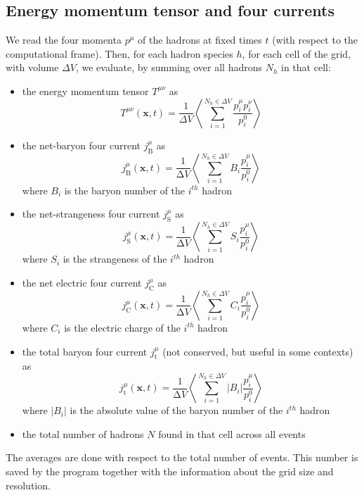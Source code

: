\documentclass[12pt, a4paper]{article}
\def\x{{\boldsymbol x}}
\begin{document}
\subsection{Energy momentum tensor and four currents}
We read the four momenta $p^\mu$ of the hadrons at fixed times $t$ (with respect to the computational frame). Then, for each hadron species $h$, for each cell of the grid, with volume $\Delta V$, we evaluate, by summing over all hadrons $N_{h}$ in that cell:
\begin{itemize}
	\item the energy momentum tensor $T^{\mu\nu}$ as
	\begin{equation}
	T^{\mu\nu}(\x,t)=\frac{1}{\Delta V}\left\langle \sum\limits_{i=1}^{N_{h} \in \Delta V} \frac{p^{\mu}_{i} p^{\nu}_{i}}{p^{0}_{i}}\right\rangle
	\label{eq:Tmunu_avg}
	\end{equation}
	\item the net-baryon four current $j^{\mu}_{\mathrm{B}}$ as
	\begin{equation}
	j^{\mu}_{\mathrm{B}}(\x,t)=\frac{1}{\mathrm{\Delta} V}\left\langle \sum\limits_{i=1}^{N_h \in \Delta V} B_i \frac{p^{\mu}_{i}}{p^{0}_{i}}\right\rangle
	\label{eq:jB_avg}
	\end{equation}
	where $B_i$  is the baryon number of the $i^{th}$ hadron
	\item the net-strangeness four current $j^{\mu}_{\mathrm{S}}$ as
	\begin{equation}
	j^{\mu}_{\mathrm{S}}(\x,t)=\frac{1}{\mathrm{\Delta} V}\left\langle \sum\limits_{i=1}^{N_h \in \Delta V} S_i \frac{p^{\mu}_{i}}{p^{0}_{i}}\right\rangle
	\label{eq:jS_avg}
	\end{equation}
	where $S_i$  is the strangeness of the $i^{th}$ hadron
	\item the net electric four current $j^{\mu}_{\mathrm{C}}$ as
	\begin{equation}
	j^{\mu}_{\mathrm{C}}(\x,t)=\frac{1}{\mathrm{\Delta} V}\left\langle \sum\limits_{i=1}^{N_h \in \Delta V} C_i \frac{p^{\mu}_{i}}{p^{0}_{i}}\right\rangle
	\label{eq:jC_avg}
	\end{equation}
	where $C_i$  is the electric charge of the $i^{th}$ hadron
	\item the total baryon four current $j^{\mu}_{\mathrm{t}}$ (not conserved, but useful in some contexts) as
	\begin{equation}
	j^{\mu}_{\mathrm{t}}(\x,t)=\frac{1}{\mathrm{\Delta} V}\left\langle \sum\limits_{i=1}^{N_h \in \Delta V} |B_i| \frac{p^{\mu}_{i}}{p^{0}_{i}}\right\rangle
	\label{eq:jt_avg}
	\end{equation}
	where $|B_i|$ is the absolute value of the baryon number of the $i^{th}$ hadron
	\item the total number of hadrons $N$ found in that cell across all events
\end{itemize} 
The averages are done with respect to the total number of events. This number is saved by the program together with the information about the grid size and resolution.\\
\end{document}
